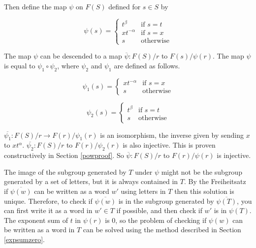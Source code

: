 \documentclass[11pt]{article} %
\theoremstyle{definition}
\theoremstyle{definition}
\theoremstyle{definition}
\theoremstyle{definition}
\theoremstyle{definition}
\theoremstyle{definition}
\begin{document}
Then define the map $\psi$ on $F(S)$ defined for $s \in S$ by

\begin{equation}
  \psi(s) =
  \begin{cases}
     t^\beta & \text{if }s = t \\
     xt^{-\alpha} &\text{if } s = x \\
     s & \text{otherwise}
  \end{cases}
\end{equation}

The map $\psi$ can be descended to a map $\overline{\psi} : F(S) / r$ to $F(s) / \psi(r)$. The map
$\psi$ is equal to $\psi_1 \circ \psi_2$,
where $\psi_2$ and $\psi_1$ are defined as follows.

\begin{equation}
  \psi_1(s) =
  \begin{cases}
     xt^{-\alpha} &\text{if } s = x \\
     s & \text{otherwise}
  \end{cases}
\end{equation}

\begin{equation}
  \psi_2(s) =
  \begin{cases}
     t^\beta & \text{if } s = t \\
     s & \text{otherwise}
  \end{cases}
\end{equation}

$\overline{\psi_1} : F(S) / r \to F(r) / \psi_1(r)$ is an isomorphism,
the inverse given by sending $x$ to $xt^\alpha$.
$\overline{\psi_2} : F(S) / r$ to $F(r) / \psi_2(r)$
is also injective.
This is proven constructively in Section \ref{powproof}.
So $\overline{\psi} : F(S) / r$ to $F(r) / \psi(r)$ is injective.

The image of the subgroup generated
by $T$ under $\psi$ might not be the subgroup generated by a set of letters, but it is
always contained in $T$.
By the Freiheitsatz if $\overline{\psi(w)}$ can be written
as a word $w'$ using letters in $T$ then this solution is unique.
Therefore, to check if $\overline{\psi(w)}$ is in the subgroup generated by
$\overline{\psi(T)}$, you can first write it as a word in $w' \in T $ if possible,
and then check if $w'$ is in $\psi(T)$.
The exponent sum of $t$ in $\psi(r)$ is $0$, so the problem of checking
if $\psi(w)$ can be written as a word in $T$ can be solved using
the method described in Section \ref{expsumzero}.
\end{document}
